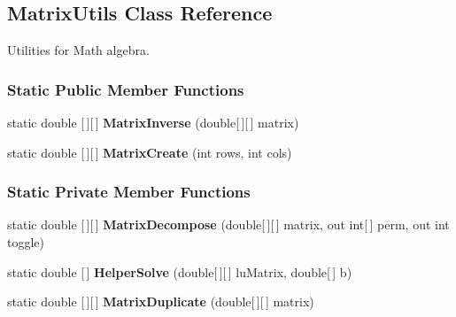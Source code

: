 \hypertarget{classDataTools_1_1MatrixUtils}{}\subsection{Matrix\+Utils Class Reference}
\label{classDataTools_1_1MatrixUtils}


Utilities for Math algebra.  


\subsubsection*{Static Public Member Functions}
\begin{DoxyCompactItemize}
\item 
\mbox{\label{classDataTools_1_1MatrixUtils_a8ef37b01bd38b764820a518f5227150c}} 
static double \mbox{[}$\,$\mbox{]}\mbox{[}$\,$\mbox{]} {\bfseries Matrix\+Inverse} (double\mbox{[}$\,$\mbox{]}\mbox{[}$\,$\mbox{]} matrix)
\item 
\mbox{\label{classDataTools_1_1MatrixUtils_a911aeda7bd108e241cbec94096196168}} 
static double \mbox{[}$\,$\mbox{]}\mbox{[}$\,$\mbox{]} {\bfseries Matrix\+Create} (int rows, int cols)
\end{DoxyCompactItemize}
\subsubsection*{Static Private Member Functions}
\begin{DoxyCompactItemize}
\item 
\mbox{\label{classDataTools_1_1MatrixUtils_a5cda0b0d9a9ec6853777101b68a2c7ed}} 
static double \mbox{[}$\,$\mbox{]}\mbox{[}$\,$\mbox{]} {\bfseries Matrix\+Decompose} (double\mbox{[}$\,$\mbox{]}\mbox{[}$\,$\mbox{]} matrix, out int\mbox{[}$\,$\mbox{]} perm, out int toggle)
\item 
\mbox{\label{classDataTools_1_1MatrixUtils_adb3379e06d76104aa9405a110ab0013e}} 
static double \mbox{[}$\,$\mbox{]} {\bfseries Helper\+Solve} (double\mbox{[}$\,$\mbox{]}\mbox{[}$\,$\mbox{]} lu\+Matrix, double\mbox{[}$\,$\mbox{]} b)
\item 
\mbox{\label{classDataTools_1_1MatrixUtils_a00b46a2b3b6a717d7f604a1f81c0faf8}} 
static double \mbox{[}$\,$\mbox{]}\mbox{[}$\,$\mbox{]} {\bfseries Matrix\+Duplicate} (double\mbox{[}$\,$\mbox{]}\mbox{[}$\,$\mbox{]} matrix)
\end{DoxyCompactItemize}


